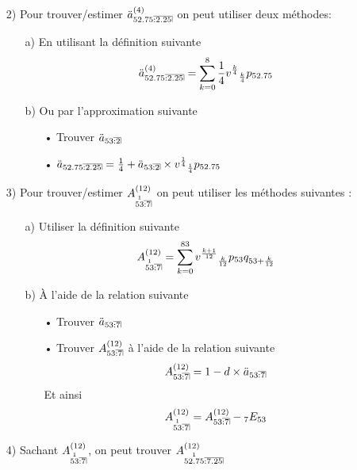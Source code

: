 \documentclass[11pt,french]{report}
\makeatletter
\DeclareRobustCommand{\annuity}[1]{%
\def\arraystretch{0}%
\setlength\arraycolsep{.7pt}%
\setlength\arrayrulewidth{.3pt}%
\begin{array}[b]{@{}c|}\hline
\\[\arraycolsep]%
\scriptstyle #1%
\end{array}%
}
\newcommand{\indiceGauche}[2]{{\vphantom{#2}}_{#1}#2}
\makeatother
\begin{document}
\begin{itemize}
\begin{itemize}
\end{itemize}
\item[2)] Pour trouver/estimer $\ddot{a}_{52.75 \annuity{:2.25}}^{(4)}$ on peut utiliser deux méthodes:
\begin{itemize}
\item[a)] En utilisant la définition suivante 
\begin{align*}
 \ddot{a}_{52.75 \annuity{:2.25}}^{(4)} &= \sum_{k = 0}^{8} \frac{1}{4} v^{\frac{k}{4}} \indiceGauche{\frac{k}{4}}{p}_{52.75} \\
\end{align*}
\item[b)] Ou par l'approximation suivante 
\begin{itemize}
\item[•] Trouver $\ddot{a}_{53 \annuity{:2}}$ 
\item[•] $\ddot{a}_{52.75 \annuity{:2.25}} = \frac{1}{4} + \ddot{a}_{53 \annuity{:2}} \times v^{\frac{1}{4}}\indiceGauche{\frac{1}{4}}{p}_{52.75} $ 
\end{itemize}
\end{itemize}
\item[3)] Pour trouver/estimer $A_{\overset{1}{53} \annuity{:7}}^{(12)}$ on peut utiliser les méthodes suivantes :
\begin{itemize}
\item[a)] Utiliser la définition suivante
\begin{align*}
A_{\overset{1}{53} \annuity{:7}}^{(12)} = \sum_{k = 0}^{83} v^{\frac{k+1}{12}} \indiceGauche{\frac{k}{12}}{p}_{53} q_{53 + \frac{k}{12}} 
\end{align*}
\item[b)] À l'aide de la relation suivante 
\begin{itemize}
\item[•] Trouver  $\ddot{a}_{53 \annuity{:7}}$
\item[•] Trouver $ A_{53 \annuity{:7}}^{(12)}$ à l'aide de la relation suivante
\begin{align*}
A_{53 \annuity{:7}}^{(12)} = 1 - d \times \ddot{a}_{53 \annuity{:7}}
\end{align*}
Et ainsi
\begin{align*}
A_{\overset{1}{53} \annuity{:7}}^{(12)} = A_{53 \annuity{:7}}^{(12)} - \indiceGauche{7}{E}_{53}
\end{align*}
\end{itemize}
\end{itemize}
\item[4)] Sachant $ A_{\overset{1}{53} \annuity{:7}}^{(12)}$, on peut trouver $A_{\overset{1}{52.75} \annuity{:7.25}}^{(12)}$
\end{itemize}
\end{document}
